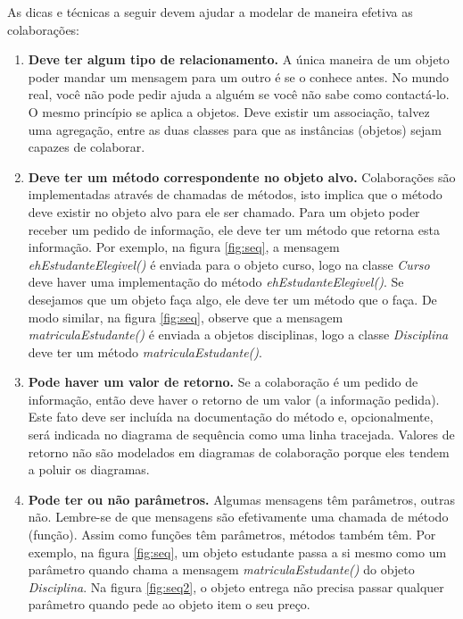 As dicas e técnicas a seguir devem ajudar a modelar de maneira efetiva as colaborações:

\begin{enumerate}
\item \textbf{Deve ter algum tipo de relacionamento.} A única maneira de um objeto poder mandar um mensagem para um outro é se o conhece antes. No mundo real, você não pode pedir ajuda a alguém se você não sabe como contactá-lo. O mesmo princípio se aplica a objetos. Deve existir um associação, talvez uma agregação, entre as duas classes para que as instâncias (objetos) sejam capazes de colaborar.

\item \textbf{Deve ter um método correspondente no objeto alvo.} Colaborações são implementadas através de chamadas de métodos, isto implica que o método deve existir no objeto alvo para ele ser chamado. Para um objeto poder receber um pedido de informação, ele deve ter um método que retorna esta informação. Por exemplo, na figura \ref{fig:seq}, a mensagem \emph{ehEstudanteElegivel()} é enviada para o objeto curso, logo na classe \emph{Curso} deve haver uma implementação do método \emph{ehEstudanteElegivel()}. Se desejamos que um objeto faça algo, ele deve ter um método que o faça. De modo similar, na figura \ref{fig:seq}, observe que a mensagem \emph{matriculaEstudante()} é enviada a objetos disciplinas, logo a classe \emph{Disciplina} deve ter um método \emph{matriculaEstudante()}.

\item \textbf{Pode haver um valor de retorno.} Se a colaboração é um pedido de informação, então deve haver o retorno de um valor (a informação pedida). Este fato deve ser incluída na documentação do método e, opcionalmente, será indicada no diagrama de sequência como uma linha tracejada. Valores de retorno não são modelados em diagramas de colaboração porque eles tendem a poluir os diagramas.

\item \textbf{Pode ter ou não parâmetros.} Algumas mensagens têm parâmetros, outras não. Lembre-se de que mensagens são efetivamente uma chamada de método (função). Assim como funções têm parâmetros, métodos também têm. Por exemplo, na figura \ref{fig:seq}, um objeto estudante passa a si mesmo como um parâmetro quando chama a mensagem \emph{matriculaEstudante()} do objeto \emph{Disciplina}. Na figura \ref{fig:seq2}, o objeto entrega não precisa passar qualquer parâmetro quando pede ao objeto item o seu preço.


\end{enumerate}
